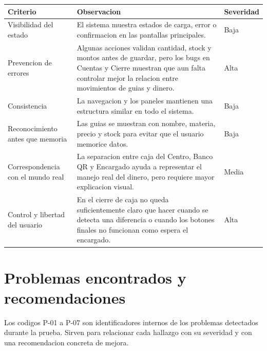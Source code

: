 \documentclass[12pt,letterpaper]{article}
\begin{document}
\begin{center}
\small
\begin{tabularx}{\textwidth}{|B{3.4cm}|Y|B{2.1cm}|}
\hline
Criterio & Observacion & Severidad \\
\hline
Visibilidad del estado & El sistema muestra estados de carga, error o confirmacion en las pantallas principales. & Baja \\
\hline
Prevencion de errores & Algunas acciones validan cantidad, stock y montos antes de guardar, pero los bugs en Cuentas y Cierre muestran que aun falta controlar mejor la relacion entre movimientos de guias y dinero. & Alta \\
\hline
Consistencia & La navegacion y los paneles mantienen una estructura similar en todo el sistema. & Baja \\
\hline
Reconocimiento antes que memoria & Las guias se muestran con nombre, materia, precio y stock para evitar que el usuario memorice datos. & Baja \\
\hline
Correspondencia con el mundo real & La separacion entre caja del Centro, Banco QR y Encargado ayuda a representar el manejo real del dinero, pero requiere mayor explicacion visual. & Media \\
\hline
Control y libertad del usuario & En el cierre de caja no queda suficientemente claro que hacer cuando se detecta una diferencia o cuando los botones finales no funcionan como espera el encargado. & Alta \\
\hline
\end{tabularx}
\end{center}

\section{Problemas encontrados y recomendaciones}

Los codigos P-01 a P-07 son identificadores internos de los problemas detectados durante la prueba. Sirven para relacionar cada hallazgo con su severidad y con una recomendacion concreta de mejora.
\end{document}
